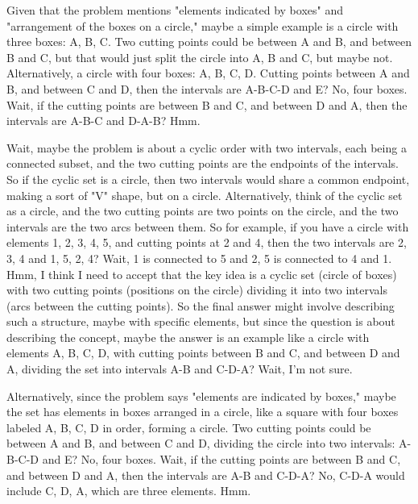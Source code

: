 Given that the problem mentions "elements indicated by boxes" and "arrangement of the boxes on a circle," maybe a simple example is a circle with three boxes: A, B, C. Two cutting points could be between A and B, and between B and C, but that would just split the circle into A, B and C, but maybe not. Alternatively, a circle with four boxes: A, B, C, D. Cutting points between A and B, and between C and D, then the intervals are A-B-C-D and E? No, four boxes. Wait, if the cutting points are between B and C, and between D and A, then the intervals are A-B-C and D-A-B? Hmm.

Wait, maybe the problem is about a cyclic order with two intervals, each being a connected subset, and the two cutting points are the endpoints of the intervals. So if the cyclic set is a circle, then two intervals would share a common endpoint, making a sort of "V" shape, but on a circle. Alternatively, think of the cyclic set as a circle, and the two cutting points are two points on the circle, and the two intervals are the two arcs between them. So for example, if you have a circle with elements 1, 2, 3, 4, 5, and cutting points at 2 and 4, then the two intervals are 2, 3, 4 and 1, 5, 2, 4? Wait, 1 is connected to 5 and 2, 5 is connected to 4 and 1. Hmm, I think I need to accept that the key idea is a cyclic set (circle of boxes) with two cutting points (positions on the circle) dividing it into two intervals (arcs between the cutting points). So the final answer might involve describing such a structure, maybe with specific elements, but since the question is about describing the concept, maybe the answer is an example like a circle with elements A, B, C, D, with cutting points between B and C, and between D and A, dividing the set into intervals A-B and C-D-A? Wait, I'm not sure.

Alternatively, since the problem says "elements are indicated by boxes," maybe the set has elements in boxes arranged in a circle, like a square with four boxes labeled A, B, C, D in order, forming a circle. Two cutting points could be between A and B, and between C and D, dividing the circle into two intervals: A-B-C-D and E? No, four boxes. Wait, if the cutting points are between B and C, and between D and A, then the intervals are A-B and C-D-A? No, C-D-A would include C, D, A, which are three elements. Hmm.

